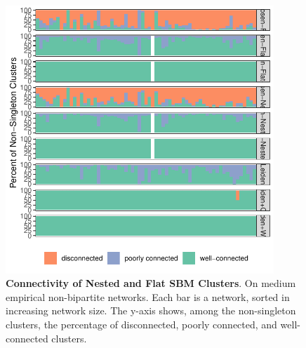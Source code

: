 \documentclass[aps,pre,superscriptaddress]{article}
\begin{document}
\begin{figure}[ht]
	\centering
	\begin{subfloat}
		\centering
		\includegraphics[width=0.9\textwidth]{figures/empirical_connectivity_unchosen_cluster.pdf}
	\end{subfloat}
	\caption{
        \textbf{Connectivity of Nested and Flat SBM Clusters}.
        On medium empirical non-bipartite networks.
		Each bar is a network, sorted in increasing network size.
		The y-axis shows, among the non-singleton clusters, the percentage of disconnected, poorly connected, and well-connected clusters.
	}
\end{figure}
\end{document}
